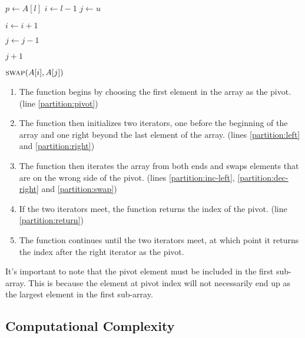 \begin{algorithmic}[1]
        \State $p \gets A[l]$ \label{partition:pivot}
        \State $i \gets l - 1$ \label{partition:left}
        \State $j \gets u$ \label{partition:right}
        
        \Loop
            \DoWhile
                \State $i \gets i + 1$ \label{partition:inc-left}

            \DoWhile
                \State $j \gets j - 1$ \label{partition:dec-right}

                \State \Return $j + 1$ \label{partition:return}
            \EndIf

            \State $\Call{swap}{A[i], A[j]}$ \label{partition:swap}
        \EndLoop
    \EndFunction
\end{algorithmic}

\begin{enumerate}
    \item The function begins by choosing the first element in the array as the pivot. (line \ref{partition:pivot})
    \item The function then initializes two iterators, one before the beginning of the array and one right beyond the last element of the array. (lines \ref{partition:left} and \ref{partition:right})
    \item The function then iterates the array from both ends and swaps elements that are on the wrong side of the pivot. (lines \ref{partition:inc-left}, \ref{partition:dec-right} and \ref{partition:swap})
    \item If the two iterators meet, the function returns the index of the pivot. (line \ref{partition:return})
    \item The function continues until the two iterators meet, at which point it returns the index after the right iterator as the pivot.
\end{enumerate}

It's important to note that the pivot element must be included in the first sub-array. This is because the element at pivot index will not necessarily end up as the largest element in the first sub-array.

\subsection{Computational Complexity}

